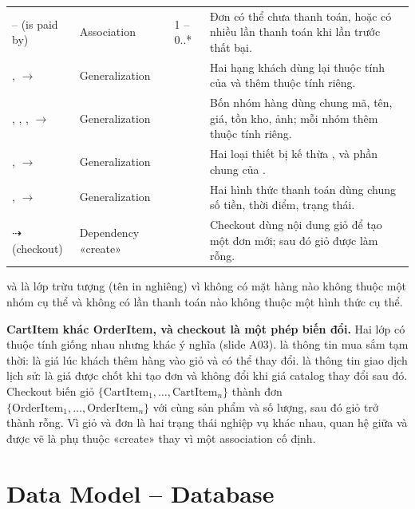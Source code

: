 \documentclass[12pt,a4paper]{article}
\begin{document}
\begin{longtable}{@{}P{4.0cm}P{2.3cm}P{1.8cm}P{7.4cm}@{}}
\small{} --  (is paid by) & \small Association & \small 1 -- 0..* & \small Đơn có thể chưa thanh toán, hoặc có nhiều lần thanh toán khi lần trước thất bại.\\
\small{},  $\to$  & \small Generalization & & \small Hai hạng khách dùng lại thuộc tính của  và thêm thuộc tính riêng.\\
\small{}, , ,  $\to$  & \small Generalization & & \small Bốn nhóm hàng dùng chung mã, tên, giá, tồn kho, ảnh; mỗi nhóm thêm thuộc tính riêng.\\
\small{},  $\to$  & \small Generalization & & \small Hai loại thiết bị kế thừa ,  và phần chung của .\\
\small{},  $\to$  & \small Generalization & & \small Hai hình thức thanh toán dùng chung số tiền, thời điểm, trạng thái.\\
\small{} $\dashrightarrow$  (checkout) & \small Dependency «create» & & \small Checkout dùng nội dung giỏ để tạo một đơn mới; sau đó giỏ được làm rỗng.\\
\bottomrule
\end{longtable}

 và  là lớp trừu tượng (tên in nghiêng) vì không có mặt hàng nào không thuộc
một nhóm cụ thể và không có lần thanh toán nào không thuộc một hình thức cụ thể.

\textbf{CartItem khác OrderItem, và checkout là một phép biến đổi.} Hai lớp có thuộc tính giống nhau
nhưng khác ý nghĩa (slide A03).  là thông tin mua sắm tạm thời:  là giá
lúc khách thêm hàng vào giỏ và có thể thay đổi.  là thông tin giao dịch lịch sử:
 là giá được chốt khi tạo đơn và không đổi khi giá catalog thay đổi sau đó. Checkout
biến giỏ $\{\text{CartItem}_1,\dots,\text{CartItem}_n\}$ thành đơn
$\{\text{OrderItem}_1,\dots,\text{OrderItem}_n\}$ với cùng sản phẩm và số lượng, sau đó giỏ trở thành
rỗng. Vì giỏ và đơn là hai trạng thái nghiệp vụ khác nhau, quan hệ giữa  và  được
vẽ là phụ thuộc «create» thay vì một association cố định.

\section{Data Model -- Database}\label{sec:42}
\end{document}
